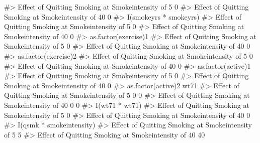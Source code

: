 \documentclass[
  10pt,
  a4paper,
]{book}
\newenvironment{Shaded}{\begin{snugshade}}{\end{snugshade}}
\newcommand{\CommentTok}[1]{\textcolor[rgb]{0.37,0.37,0.37}{#1}}
\begin{document}
\begin{Shaded}
\begin{Highlighting}[]
\CommentTok{\#\textgreater{} Effect of Quitting Smoking at Smokeintensity of 5         0}
\CommentTok{\#\textgreater{} Effect of Quitting Smoking at Smokeintensity of 40        0}
\CommentTok{\#\textgreater{}                                                    I(smokeyrs * smokeyrs)}
\CommentTok{\#\textgreater{} Effect of Quitting Smoking at Smokeintensity of 5                       0}
\CommentTok{\#\textgreater{} Effect of Quitting Smoking at Smokeintensity of 40                      0}
\CommentTok{\#\textgreater{}                                                    as.factor(exercise)1}
\CommentTok{\#\textgreater{} Effect of Quitting Smoking at Smokeintensity of 5                     0}
\CommentTok{\#\textgreater{} Effect of Quitting Smoking at Smokeintensity of 40                    0}
\CommentTok{\#\textgreater{}                                                    as.factor(exercise)2}
\CommentTok{\#\textgreater{} Effect of Quitting Smoking at Smokeintensity of 5                     0}
\CommentTok{\#\textgreater{} Effect of Quitting Smoking at Smokeintensity of 40                    0}
\CommentTok{\#\textgreater{}                                                    as.factor(active)1}
\CommentTok{\#\textgreater{} Effect of Quitting Smoking at Smokeintensity of 5                   0}
\CommentTok{\#\textgreater{} Effect of Quitting Smoking at Smokeintensity of 40                  0}
\CommentTok{\#\textgreater{}                                                    as.factor(active)2 wt71}
\CommentTok{\#\textgreater{} Effect of Quitting Smoking at Smokeintensity of 5                   0    0}
\CommentTok{\#\textgreater{} Effect of Quitting Smoking at Smokeintensity of 40                  0    0}
\CommentTok{\#\textgreater{}                                                    I(wt71 * wt71)}
\CommentTok{\#\textgreater{} Effect of Quitting Smoking at Smokeintensity of 5               0}
\CommentTok{\#\textgreater{} Effect of Quitting Smoking at Smokeintensity of 40              0}
\CommentTok{\#\textgreater{}                                                    I(qsmk * smokeintensity)}
\CommentTok{\#\textgreater{} Effect of Quitting Smoking at Smokeintensity of 5                         5}
\CommentTok{\#\textgreater{} Effect of Quitting Smoking at Smokeintensity of 40                       40}


\end{Highlighting}
\end{Shaded}
\end{document}
